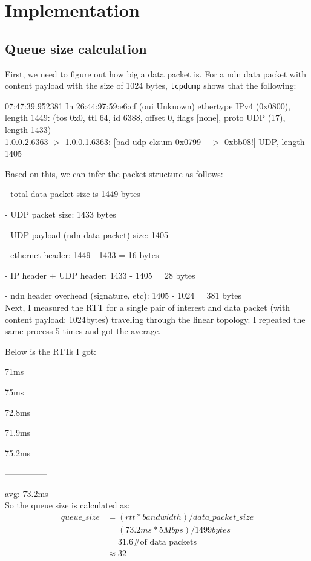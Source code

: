 \documentclass[10pt]{article}
\begin{document}
\section{Implementation}

\subsection{Queue size calculation}

First, we need to figure out how big a data packet is.
For a ndn data packet with content payload with the size of 1024 bytes,
\texttt{tcpdump} shows that the following:

\begin{mdframed}
07:47:39.952381  In 26:44:97:59:e6:cf (oui Unknown) ethertype IPv4
(0x0800), length 1449: (tos 0x0, ttl 64, id 6388, offset 0, flags
[none], proto UDP (17), length 1433)\\
    1.0.0.2.6363 $>$ 1.0.0.1.6363: [bad udp cksum 0x0799 $->$ 0xbb08!]
    UDP, length 1405
\end{mdframed}

Based on this, we can infer the packet structure as follows:

- total data packet size is 1449 bytes

- UDP packet size: 1433 bytes

- UDP payload (ndn data packet) size: 1405

- ethernet header: 1449 - 1433 = 16 bytes

- IP header + UDP header: 1433 - 1405 = 28 bytes

- ndn header overhead (signature, etc): 1405 - 1024 = 381 bytes\\

Next, I measured the RTT for a single pair of interest and data packet
(with content payload: 1024bytes) traveling through the linear
topology. I repeated the same process 5 times and got the average.

Below is the RTTs I got:

71ms

75ms

72.8ms

71.9ms

75.2ms

---------------

avg: 73.2ms\\

So the queue size is calculated as:
\begin{align*}
  queue\_size &= (rtt * bandwidth) / data\_packet\_size\\
  &= (73.2ms * 5Mbps) / 1499bytes\\
  &= 31.6 \# \text{of data packets}\\
  &\approx 32
\end{align*}
\end{document}
